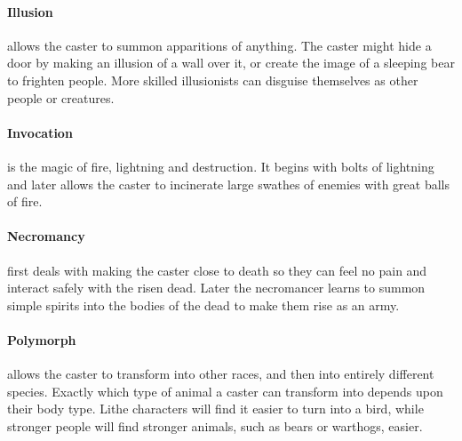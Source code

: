 \begin{multicols}{2}
\paragraph{Illusion} allows the caster to summon apparitions of anything. The caster might hide a door by making an illusion of a wall over it, or create the image of a sleeping bear to frighten people. More skilled illusionists can disguise themselves as other people or creatures.

\paragraph{Invocation} is the magic of fire, lightning and destruction. It begins with bolts of lightning and later allows the caster to incinerate large swathes of enemies with great balls of fire.

\paragraph{Necromancy} first deals with making the caster close to death so they can feel no pain and interact safely with the risen dead.
Later the necromancer learns to summon simple spirits into the bodies of the dead to make them rise as an army.

\paragraph{Polymorph} allows the caster to transform into other races, and then into entirely different species.
Exactly which type of animal a caster can transform into depends upon their body type.
Lithe characters will find it easier to turn into a bird, while stronger people will find stronger animals, such as bears or warthogs, easier.

\end{multicols}

\startcontents[magic]


